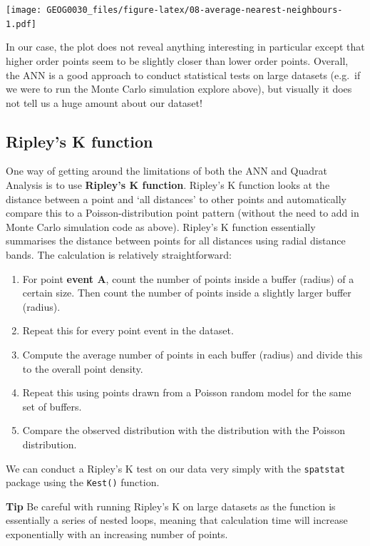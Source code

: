 \documentclass[
]{book}
\providecommand{\tightlist}{%
  \setlength{\itemsep}{0pt}\setlength{\parskip}{0pt}}
\begin{document}
\texttt{[image: GEOG0030\_files/figure-latex/08-average-nearest-neighbours-1.pdf]}

In our case, the plot does not reveal anything interesting in particular except that higher order points seem to be slightly closer than lower order points. Overall, the ANN is a good approach to conduct statistical tests on large datasets (e.g.~if we were to run the Monte Carlo simulation explore above), but visually it does not tell us a huge amount about our dataset!

\hypertarget{ripleys-k-function}{%
\subsection{Ripley's K function}\label{ripleys-k-function}}

One way of getting around the limitations of both the ANN and Quadrat Analysis is to use \textbf{Ripley's K function}. Ripley's K function looks at the distance between a point and `all distances' to other points and automatically compare this to a Poisson-distribution point pattern (without the need to add in Monte Carlo simulation code as above). Ripley's K function essentially summarises the distance between points for all distances using radial distance bands. The calculation is relatively straightforward:

\begin{enumerate}
\def\labelenumi{\arabic{enumi}.}
\tightlist
\item
  For point \textbf{event A}, count the number of points inside a buffer (radius) of a certain size. Then count the number of points inside a slightly larger buffer (radius).
\item
  Repeat this for every point event in the dataset.
\item
  Compute the average number of points in each buffer (radius) and divide this to the overall point density.
\item
  Repeat this using points drawn from a Poisson random model for the same set of buffers.
\item
  Compare the observed distribution with the distribution with the Poisson distribution.
\end{enumerate}

We can conduct a Ripley's K test on our data very simply with the \texttt{spatstat} package using the \texttt{Kest()} function.

\textbf{Tip}
Be careful with running Ripley's K on large datasets as the function is essentially a series of nested loops, meaning that calculation time will increase exponentially with an increasing number of points.
\end{document}
